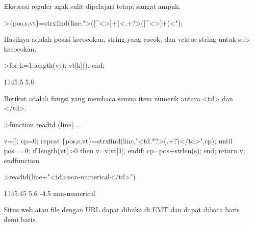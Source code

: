 \documentclass[a4paper,10pt]{article}
\begin{document}
\begin{eulernotebook}
\begin{eulercomment}
\begin{eulercomment}
\begin{eulercomment}
\begin{eulercomment}
\begin{eulercomment}
\begin{eulercomment}
\begin{eulercomment}
\begin{eulercomment}
\begin{eulercomment}
Ekspresi reguler agak sulit dipelajari tetapi sangat ampuh.
\end{eulercomment}
\begin{eulerprompt}
>\{pos,s,vt\}=strxfind(line,">([^<>]+)<.+?>([^<>]+)<");
\end{eulerprompt}
\begin{eulercomment}
Hasilnya adalah posisi kecocokan, string yang cocok, dan vektor string
untuk sub-kecocokan.
\end{eulercomment}
\begin{eulerprompt}
>for k=1:length(vt); vt[k](), end;
\end{eulerprompt}
\begin{euleroutput}
  1145.5
  5.6
\end{euleroutput}
\begin{eulercomment}
Berikut adalah fungsi yang membaca semua item numerik antara \textless{}td\textgreater{} dan
\textless{}/td\textgreater{}.
\end{eulercomment}
\begin{eulerprompt}
>function readtd (line) ...
\end{eulerprompt}
\begin{eulerudf}
  v=[]; cp=0;
  repeat
     \{pos,s,vt\}=strxfind(line,"<td.*?>(.+?)</td>",cp);
     until pos==0;
     if length(vt)>0 then v=v|vt[1]; endif;
     cp=pos+strlen(s);
  end;
  return v;
  endfunction
\end{eulerudf}
\begin{eulerprompt}
>readtd(line+"<td>non-numerical</td>")
\end{eulerprompt}
\begin{euleroutput}
  1145.45
  5.6
  -4.5
  non-numerical
\end{euleroutput}
\begin{eulercomment}
Situs web atau file dengan URL dapat dibuka di EMT dan dapat dibaca
baris demi baris.


\end{eulercomment}
\end{eulercomment}
\end{eulercomment}
\end{eulercomment}
\end{eulercomment}
\end{eulercomment}
\end{eulercomment}
\end{eulercomment}
\end{eulercomment}
\end{eulernotebook}
\end{document}
